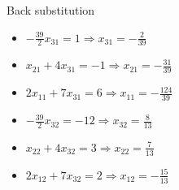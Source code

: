 \begin{exercise}{4}
Back substitution
\begin{multicols}{2}
\begin{itemize}
\item $-\frac{39}{2}x_{31} = 1 \Rightarrow x_{31} = -\frac{2}{39}$
\item $x_{21}+4x_{31} = -1 \Rightarrow x_{21} = -\frac{31}{39}$
\item $2x_{11}+7x_{31} = 6 \Rightarrow x_{11} = -\frac{124}{39}$
\end{itemize}
\begin{itemize}
\item $-\frac{39}{2}x_{32} = -12 \Rightarrow x_{32} = \frac{8}{13}$
\item $x_{22}+4x_{32} = 3 \Rightarrow x_{22} = \frac{7}{13}$
\item $2x_{12}+7x_{32} = 2 \Rightarrow x_{12} = -\frac{15}{13}$
\end{itemize}
\end{multicols}
\end{exercise}
